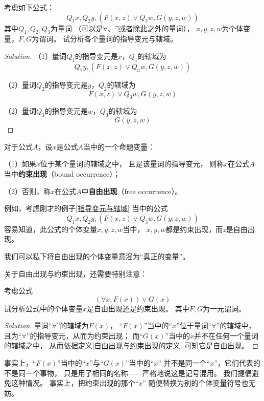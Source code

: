 \begin{example}考虑如下公式：
$$Q_1x,Q_2y,(F(x,z)\vee Q_3w,G(y,z,w))$$
其中$Q_1,Q_2,Q_3$为量词
（可以是$\forall$、$\exists$或者除此之外的量词），
$x,y,z,w$为个体变量，$F,G$为谓词。
试分析各个量词的指导变元与辖域。
\label{指导变元与辖域}
\end{example}

\begin{proof}[Solution]\kong

（1）量词$Q_1$的指导变元是$x$，$Q_1$的辖域为
$$Q_2y,(F(x,z)\vee Q_3w,G(y,z,w))$$

（2）量词$Q_2$的指导变元是$y$，$Q_2$的辖域为
$$F(x,z)\vee Q_3w,G(y,z,w)$$

（2）量词$Q_3$的指导变元是$w$，$Q_3$的辖域为
$$G(y,z,w)$$
\end{proof}

\begin{definition}[个体变量的出现]
对于公式$A$，设$x$是公式$A$当中的一个命题变量：

（1）如果$x$位于某个量词的辖域之中，
且是该量词的指导变元，
则称$x$在公式$A$当中\textbf{约束出现}（bound occurrence）；

（2）否则，称$x$在公式$A$中\textbf{自由出现}（free occurrence）。
\label{自由出现与约束出现的定义}
\end{definition}

例如，考虑刚才的例子\ref{指导变元与辖域}
当中的公式
$$Q_1x,Q_2y,(F(x,z)\vee Q_3w,G(y,z,w))$$
容易知道，此公式的个体变量$x,y,z,w$当中，
$x,y,w$都是约束出现，而$z$是自由出现。

我们可以私下将自由出现的个体变量意淫为“真正的变量”。

关于自由出现与约束出现，还需要特别注意：

\begin{example}考虑公式
$$(\forall x,F(x))\vee G(x)$$
试分析公式中的个体变量$x$是自由出现还是约束出现。
其中$F,G$为一元谓词。
\end{example}

\begin{proof}[Solution]
量词“$\forall$”的辖域为$F(x)$，
“$F(x)$”当中的“$x$”位于量词“$\forall$”的辖域中，
且为“$\forall$”的指导变元，从而为约束出现；
而“$G(x)$”当中的$x$并不在任何一个量词的辖域之中，
从而依据定义\ref{自由出现与约束出现的定义}
可知它是自由出现。
\end{proof}

事实上，“$F(x)$”当中的“$x$”与“$G(x)$”当中的“$x$”
并不是同一个“$x$”，它们代表的不是同一个事物，
只是用了相同的名称——严格地说这是记号混用。
我们提倡避免这种情况。
事实上，把约束出现的那个“$x$”
随便替换为别的个体变量符号也无妨。

